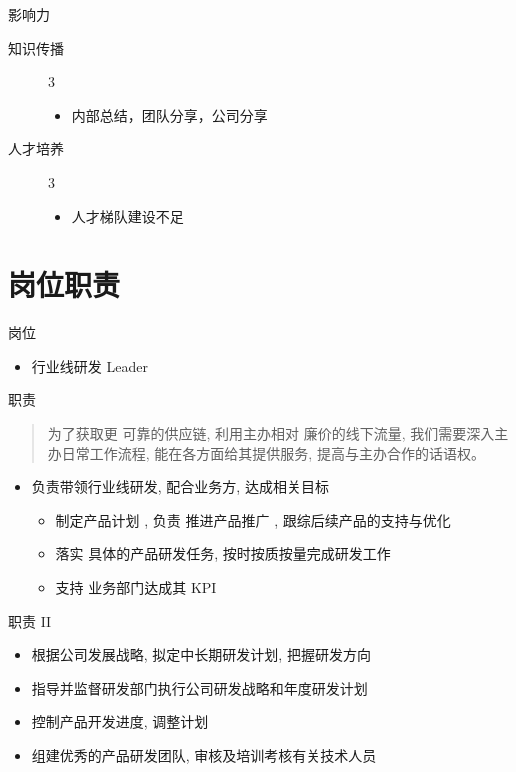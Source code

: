 \documentclass[presentation, bigger]{beamer}
\begin{document}
\begin{frame}[label={sec:org1c1e921}]{影响力}
\begin{description}
\item[{知识传播}] 3
\begin{itemize}
\item 内部总结，团队分享，公司分享
\end{itemize}
\item[{人才培养}] 3
\begin{itemize}
\item 人才梯队建设不足
\end{itemize}
\end{description}
\end{frame}

\section{岗位职责}
\label{sec:org9a7b49e}
\begin{frame}[label={sec:org966d8fb}]{岗位}
\begin{itemize}
\item 行业线研发 Leader
\end{itemize}
\end{frame}
\begin{frame}[label={sec:orgface95e}]{职责}
\begin{quote}
为了获取更 \alert{可靠的供应链}, 利用主办相对 \alert{廉价的线下流量}, 我们需要深入主办日常工作流程, 能在各方面给其提供服务, 提高与主办合作的话语权。
\end{quote}
\begin{itemize}
\item 负责带领行业线研发, 配合业务方, 达成相关目标
\begin{itemize}
\item \alert{制定产品计划} , 负责 \alert{推进产品推广} , 跟综后续产品的支持与优化
\item \alert{落实} 具体的产品研发任务, 按时按质按量完成研发工作
\item \alert{支持} 业务部门达成其 KPI
\end{itemize}
\end{itemize}
\end{frame}

\begin{frame}[label={sec:org00090eb}]{职责 II}
\begin{itemize}
\item 根据公司发展战略, 拟定中长期研发计划, 把握研发方向
\item 指导并监督研发部门执行公司研发战略和年度研发计划
\item 控制产品开发进度, 调整计划
\item 组建优秀的产品研发团队, 审核及培训考核有关技术人员
\end{itemize}
\end{frame}
\end{document}
